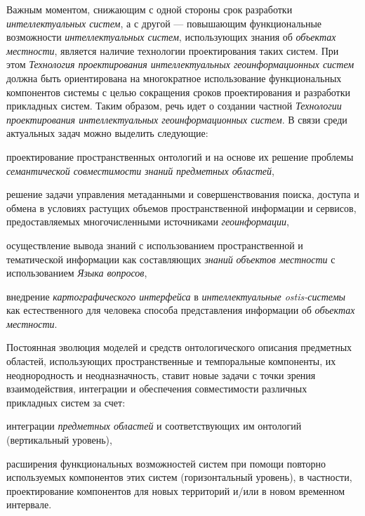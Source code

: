 Важным моментом, снижающим с одной стороны срок разработки \textit{интеллектуальных систем}, а с другой --- повышающим функциональные возможности \textit{интеллектуальных систем}, использующих знания об \textit{объектах местности}, является наличие технологии проектирования таких систем. При этом \textit{Технология проектирования интеллектуальных геоинформационных систем} должна быть ориентирована на многократное использование функциональных компонентов системы с целью сокращения сроков проектирования и разработки прикладных систем. Таким образом, речь идет о создании частной \textit{Технологии проектирования интеллектуальных геоинформационных систем}. В связи среди актуальных задач можно выделить следующие: 
\begin{textitemize}
	\item проектирование пространственных онтологий и на основе их решение проблемы \textit{семантической совместимости} \textit{знаний} \textit{предметных областей}, 
	\item решение задачи управления метаданными и совершенствования поиска, доступа и обмена в условиях растущих объемов пространственной информации и сервисов, предоставляемых многочисленными источниками \textit{геоинформации}, 
	\item осуществление вывода знаний с использованием пространственной и тематической информации как составляющих \textit{знаний} \textit{объектов местности} с использованием \textit{Языка вопросов},
	\item внедрение \textit{картографического интерфейса} в \textit{интеллектуальные ostis-системы} как естественного для человека способа представления информации об \textit{объектах местности}.
\end{textitemize}

Постоянная эволюция моделей и средств онтологического описания предметных областей, использующих пространственные и темпоральные компоненты, их неоднородность и неодназначность, ставит новые задачи с точки зрения взаимодействия, интеграции и обеспечения совместимости различных прикладных систем за счет:
\begin{textitemize}
	\item интеграции \textit{предметных областей} и соответствующих им онтологий (вертикальный уровень), 
	\item расширения функциональных возможностей систем при помощи повторно используемых компонентов этих систем (горизонтальный уровень), в частности, проектирование компонентов для новых территорий и/или в новом временном интервале.
\end{textitemize}

